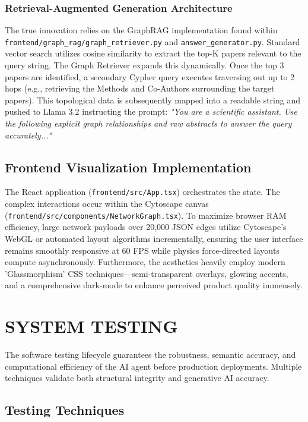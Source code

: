 \documentclass[12pt,a4paper]{report}
\begin{document}
\subsection{Retrieval-Augmented Generation Architecture}
The true innovation relies on the GraphRAG implementation found within \newline\texttt{frontend/graph\_rag/graph\_retriever.py} and \texttt{answer\_generator.py}. Standard vector search utilizes cosine similarity to extract the top-K papers relevant to the query string. The Graph Retriever expands this dynamically. Once the top 3 papers are identified, a secondary Cypher query executes traversing out up to 2 hops (e.g., retrieving the Methods and Co-Authors surrounding the target papers).
This topological data is subsequently mapped into a readable string and pushed to Llama 3.2 instructing the prompt:
\textit{"You are a scientific assistant. Use the following explicit graph relationships and raw abstracts to answer the query accurately..."}

\section{Frontend Visualization Implementation}
The React application (\texttt{frontend/src/App.tsx}) orchestrates the state. The complex interactions occur within the Cytoscape canvas \newline(\texttt{frontend/src/components/NetworkGraph.tsx}). To maximize browser RAM efficiency, large network payloads over 20,000 JSON edges utilize Cytoscape's WebGL or automated layout algorithms incrementally, ensuring the user interface remains smoothly responsive at 60 FPS while physics force-directed layouts compute asynchronously. Furthermore, the aesthetics heavily employ modern 'Glassmorphism' CSS techniques—semi-transparent overlays, glowing accents, and a comprehensive dark-mode to enhance perceived product quality immensely.

\chapter{SYSTEM TESTING}
\noindent{\rule{\textwidth}{1.5pt}}

The software testing lifecycle guarantees the robustness, semantic accuracy, and computational efficiency of the AI agent before production deployments. Multiple techniques validate both structural integrity and generative AI accuracy.

\section{Testing Techniques}
\end{document}
